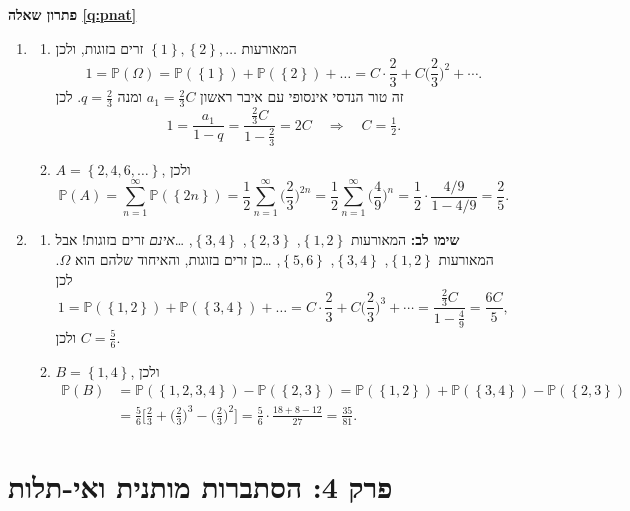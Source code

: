 \documentclass[11pt,a4paper]{report}
\newcommand{\flag}{\tikz[baseline=-0.1ex,x=0.9ex,y=0.9ex]{\draw[line width=0.5pt] (0,-0.3)--(0,1.6); \fill (0,1.6)--(1.2,1.2)--(0,0.8)--cycle;}}
\newcounter{todo}
\newcommand{\addtodo}[1]{\refstepcounter{todo}%
  \addcontentsline{tdo}{todo}{\protect\numberline{\thetodo}#1}}
\newcommand{\needcheck}[1]{\addtodo{#1}%
  {\color{todoc}\sffamily\small\,[\textbf{\flag{}\,\thetodo\ לבדיקה:} #1]\,}}
\renewcommand{\needcheck}[1]{}
\newcommand{\set}[1]{\left\{#1\right\}}
\newcommand{\PP}{\mathbb{P}}
\newenvironment{solution}[1]{\par\bigskip\noindent
  {\sffamily\bfseries\color{thmc}פתרון שאלה \ref{q:#1}}\par\nopagebreak\smallskip}%
  {\par\medskip\noindent{\color{exc!50}\rule{\linewidth}{0.4pt}}\par}
\newcommand{\ans}[1]{\boxed{#1}}
\begin{document}
\begin{solution}{pnat}
\begin{enumerate}[label=(\alph*)]
  \item
  \begin{enumerate}[label=(\arabic*)]
    \item המאורעות $\set1,\set2,\dots$ זרים בזוגות, ולכן
    \[
      1=\PP(\Omega)=\PP(\set1)+\PP(\set2)+\dots=C\cdot\frac23+C\Big(\frac23\Big)^2+\cdots.
    \]
    זה טור הנדסי אינסופי עם איבר ראשון $a_1=\frac23C$ ומנה $q=\frac23$. לכן
    \[
      1=\frac{a_1}{1-q}=\frac{\frac23C}{1-\frac23}=2C\quad\Longrightarrow\quad\ans{C=\tfrac12}.
    \]
    \item $A=\set{2,4,6,\dots}$, ולכן
    \[
      \PP(A)=\sum_{n=1}^\infty\PP(\set{2n})=\frac12\sum_{n=1}^\infty\Big(\frac23\Big)^{2n}=\frac12\sum_{n=1}^\infty\Big(\frac49\Big)^n=\frac12\cdot\frac{4/9}{1-4/9}=\ans{\frac25}.
    \]
  \end{enumerate}
  \item
  \begin{enumerate}[label=(\arabic*)]
    \item \textbf{שימו לב:} המאורעות $\set{1,2}$, $\set{2,3}$, $\set{3,4}$, \dots \emph{אינם} זרים בזוגות! אבל המאורעות $\set{1,2}$, $\set{3,4}$, $\set{5,6}$, \dots כן זרים בזוגות, והאיחוד שלהם הוא $\Omega$. לכן
    \[
      1=\PP(\set{1,2})+\PP(\set{3,4})+\dots=C\cdot\frac23+C\Big(\frac23\Big)^3+\cdots=\frac{\frac23C}{1-\frac49}=\frac{6C}5,
    \]
    ולכן $\ans{C=\tfrac56}$.
    \needcheck{בדף הפתרונות נכתב $\set{1,2},\set{3,4},\set{4,5},\dots$; תיקנתי ל-$\set{5,6}$}
    \item $B=\set{1,4}$, ולכן
    \[
    \begin{split}
      \PP(B)&=\PP(\set{1,2,3,4})-\PP(\set{2,3})=\PP(\set{1,2})+\PP(\set{3,4})-\PP(\set{2,3})\\
      &=\frac56\Big[\frac23+\Big(\frac23\Big)^3-\Big(\frac23\Big)^2\Big]=\frac56\cdot\frac{18+8-12}{27}=\ans{\frac{35}{81}}.
    \end{split}
    \]
  \end{enumerate}
\end{enumerate}
\end{solution}

\section*{פרק 4: הסתברות מותנית ואי-תלות}
\end{document}
